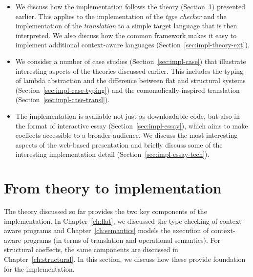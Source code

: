 \begin{itemize}
\item We discuss how the implementation follows the theory (Section~\ref{sec:impl-theory}) presented earlier.
  This applies to the implementation of the \emph{type checker} and the implementation of the \emph{translation}
  to a simple target language that is then interpreted. We also discuss how the common framework makes it
  easy to implement additional context-aware languages (Section~\ref{sec:impl-theory-ext}).

\item We consider a number of case studies (Section~\ref{sec:impl-case}) that illustrate interesting
  aspects of the theories discussed earlier. This includes the typing of lambda abstraction and the
  difference between flat and structural systems (Section~\ref{sec:impl-case-typing}) and the
  comonadically-inspired translation (Section~\ref{sec:impl-case-transl}).

\item The implementation is available not just as downloadable code, but also in the format of
  interactive essay (Section~\ref{sec:impl-essay}), which aims to make coeffects
  accessible to a broader audience. We discuss the most interesting aspects of the web-based
  presentation and briefly discuss some of the interesting implementation detail
  (Section~\ref{sec:impl-essay-tech}).
\end{itemize}

%
%

\section{From theory to implementation}
\label{sec:impl-theory}

The theory discussed so far provides the two key components of the implementation. In
Chapter~\ref{ch:flat}, we discussed the type checking of context-aware programs and
Chapter~\ref{ch:semantics} models the execution of context-aware programs (in terms of
translation and operational semantics). For structural coeffects, the same components are discussed
in Chapter~\ref{ch:structural}. In this section, we discuss how these provide foundation for the
implementation.

